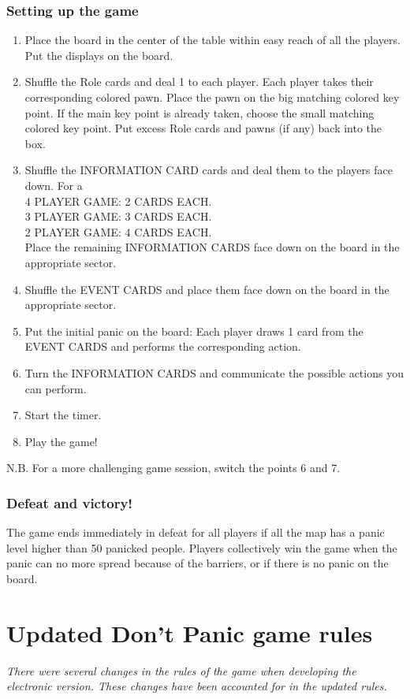 \subsection*{Setting up the game}
\begin{enumerate}
	\item Place the board in the center of the table within easy reach of all the players. Put the displays on the board.
	\item Shuffle the Role cards and deal 1 to each player. Each player takes their corresponding colored pawn. Place the pawn on the big matching colored key point. If the main key point is already taken, choose the small matching colored key point. Put excess Role cards and pawns (if any) back into the box.
	\item Shuffle the INFORMATION CARD cards and deal them to the players face down. For a \\4 PLAYER GAME: 2 CARDS EACH.  \\3 PLAYER GAME: 3 CARDS EACH. \\2 PLAYER GAME: 4 CARDS EACH. \\Place the remaining INFORMATION CARDS face down on the board in the appropriate sector. 	
	\item Shuffle the EVENT CARDS and place them face down on the board in the 	appropriate sector.
	\item Put the initial panic on the board: Each player draws 1 card from the EVENT CARDS and performs the corresponding action.
	\item Turn the INFORMATION CARDS and communicate the possible actions you can perform.
	\item Start the timer.
	\item Play the game! 	
\end{enumerate}

N.B. For a more challenging game session, switch the points 6 and 7. \\
%
\subsection*{Defeat and victory!}
The game ends immediately in defeat for all players if all the map has a panic level higher than 50 panicked people. Players collectively win the game when the panic can no more spread because of the barriers, or if there is no panic on the board.


\chapter{Updated Don't Panic game rules}
\label{appendix:C}
%
\emph{There were several changes in the rules of the game when developing the electronic version. These changes have been accounted for in the updated rules.}
%
%
